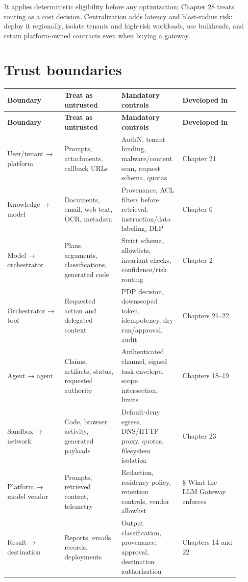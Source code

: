 It applies deterministic eligibility before any optimization; Chapter 28 treats routing as a cost decision. Centralization adds latency and blast-radius risk: deploy it regionally, isolate tenants and high-risk workloads, use bulkheads, and retain platform-owned contracts even when buying a gateway.\par

\section{Trust boundaries}

\BookTableStart
\fontsize{7.2}{9}\selectfont
\begin{longtable}{@{}Y{0.2350\linewidth}Y{0.2350\linewidth}Y{0.2350\linewidth}Y{0.2350\linewidth}@{}}
\color{white}\bfseries \textbf{Boundary} & \color{white}\bfseries \textbf{Treat as untrusted} & \color{white}\bfseries \textbf{Mandatory controls} & \color{white}\bfseries \textbf{Developed in} \\
\endfirsthead
{}
\color{white}\bfseries \textbf{Boundary} & \color{white}\bfseries \textbf{Treat as untrusted} & \color{white}\bfseries \textbf{Mandatory controls} & \color{white}\bfseries \textbf{Developed in} \\
\endhead
User/tenant → platform & Prompts, attachments, callback URLs & AuthN, tenant binding, malware/content scan, request schema, quotas & Chapter 21 \\
Knowledge → model & Documents, email, web text, OCR, metadata & Provenance, ACL filters before retrieval, instruction/data labeling, DLP & Chapter 6 \\
Model → orchestrator & Plans, arguments, classifications, generated code & Strict schema, allowlists, invariant checks, confidence/risk routing & Chapter 2 \\
Orchestrator → tool & Requested action and delegated context & PDP decision, downscoped token, idempotency, dry-run/approval, audit & Chapters 21–22 \\
Agent → agent & Claims, artifacts, status, requested authority & Authenticated channel, signed task envelope, scope intersection, limits & Chapters 18–19 \\
Sandbox → network & Code, browser activity, generated payloads & Default-deny egress, DNS/HTTP proxy, quotas, filesystem isolation & Chapter 23 \\
Platform → model vendor & Prompts, retrieved content, telemetry & Redaction, residency policy, retention controls, vendor allowlist & § What the LLM Gateway enforces \\
Result → destination & Reports, emails, records, deployments & Output classification, provenance, approval, destination authorization & Chapters 14 and 22 \\
\end{longtable}
\BookTableEnd

